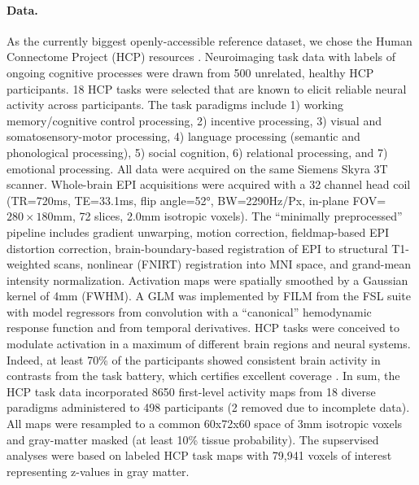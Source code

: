 \documentclass{article} %
\begin{document}
\paragraph{Data.}
As the currently biggest openly-accessible reference dataset,
we chose the Human Connectome Project (HCP) resources
\cite{barch2013}.
Neuroimaging task data with labels of ongoing cognitive processes
were drawn from 500 unrelated,
healthy HCP participants.
18 HCP tasks 
were selected that are known to elicit reliable neural activity
across participants.
The task paradigms include
1) working memory/cognitive control processing, 2)
incentive processing, 3) visual and somatosensory-motor processing,
4) language processing (semantic and phonological processing),
5) social cognition, 6) relational processing, and 7) emotional
processing. All data were acquired on the same Siemens Skyra 3T scanner.
Whole-brain EPI acquisitions were acquired with a
32 channel head coil (TR=720ms, TE=33.1ms, flip angle=52°, BW=2290Hz/Px,
in-plane FOV=$280\times180$mm, 72 slices, 2.0mm isotropic voxels).
The ``minimally preprocessed'' pipeline includes
gradient unwarping, motion correction, fieldmap-based EPI distortion
correction, brain-boundary-based registration of EPI to structural
T1-weighted scans, nonlinear (FNIRT) registration into MNI space,
and grand-mean intensity normalization. Activation maps were spatially
smoothed by a Gaussian kernel of 4mm (FWHM). A GLM was
implemented by FILM from the FSL suite with model regressors from convolution
with a “canonical” hemodynamic response function and from temporal derivatives.
HCP tasks were conceived to modulate activation
in a maximum of different brain regions and neural systems. Indeed, at
least 70\% of the participants showed consistent brain activity in
contrasts from the task battery, which certifies excellent
coverage \cite{barch2013}.
In sum, the HCP task data incorporated 8650 first-level activity maps
from 18 diverse paradigms administered to 498 participants (2 removed
due to incomplete data).
All maps were resampled to a common 60x72x60 space of
3mm isotropic voxels and gray-matter masked (at least 10\% tissue
probability).
The supservised analyses were based on labeled HCP task maps with
79,941 voxels of interest representing z-values in gray matter.
\end{document}
